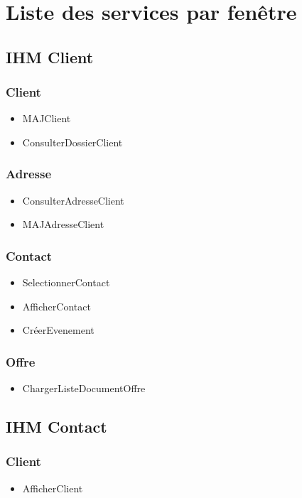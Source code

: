 \section{Liste des services par fenêtre}

\subsection{IHM Client}

\subsubsection{Client}
\begin{itemize}
\item MAJClient
\item ConsulterDossierClient
\end{itemize}

\subsubsection{Adresse}
\begin{itemize}
\item ConsulterAdresseClient
\item MAJAdresseClient
\end{itemize}

\subsubsection{Contact}
\begin{itemize}
\item SelectionnerContact
\item AfficherContact
\item CréerEvenement
\end{itemize}

\subsubsection{Offre}
\begin{itemize}
\item ChargerListeDocumentOffre
\end{itemize}


\subsection{IHM Contact}


\subsubsection{Client}
\begin{itemize}
\item AfficherClient
\end{itemize}

